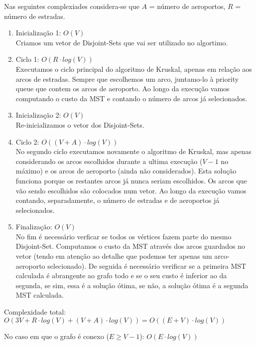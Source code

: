 \documentclass[a4paper]{article}
\begin{document}
Nas seguintes complexiades considera-se que $A$ = número de aeroportos, $R$ = número de estradas.

\begin{enumerate}
	\item Inicialização 1: $O(V)$\\
	Criamos um vetor de Disjoint-Sets que vai ser utilizado no algortimo.
	\item Ciclo 1: $O(R\cdot log(V))$\\
	Executamos o ciclo principal do algoritmo de Kruskal, apenas em relação
	aos arcos de estradas.
	Sempre que escolhemos um arco, juntamo-lo à priority queue que contem os arcos de aeroporto.
	Ao longo da execução vamos computando o custo da MST e contando o número
	de arcos já selecionados.
	\item Inicialização 2: $O(V)$\\
	Re-inicializamos o vetor dos Disjoint-Sets.
	\item Ciclo 2: $O( (V + A) \cdot log(V))$\\
	No segundo ciclo executamos novamente o algoritmo de Kruskal, mas apenas considerando
	os arcos escolhidos durante a ultima execução ($V-1$ no máximo) e os arcos de aeroporto (ainda não considerados).
	Esta solução funciona porque os restantes arcos já nunca seriam escolhidos.
	Os arcos que vão sendo escolhidos são colocados num vetor.
	Ao longo da execução vamos contando, separadamente, o número de estradas
	e de aeroportos já selecionados.
	\item Finalização: $O(V)$\\
	No fim é necessário verficar se todos os vértices fazem parte do mesmo Disjoint-Set.
	Computamos o custo da MST através dos arcos guardados no vetor (tendo em atenção
	ao detalhe que podemos ter apenas um arco-aeroporto selecionado).
	De seguida é necessário verificar se a primeira MST calculada é abrangente ao grafo todo
	e se o seu custo é inferior ao da segunda, se sim, essa é a solução ótima, se não, a solução
	ótima é a segunda MST calculada.
\end{enumerate}

Complexidade total: $O(3V + R\cdot log(V) + (V+A)\cdot log(V)) = O((E+V)\cdot log(V))$

No caso em que o grafo é conexo ($E \geq V-1$): $O(E\cdot log(V))$
\end{document}

